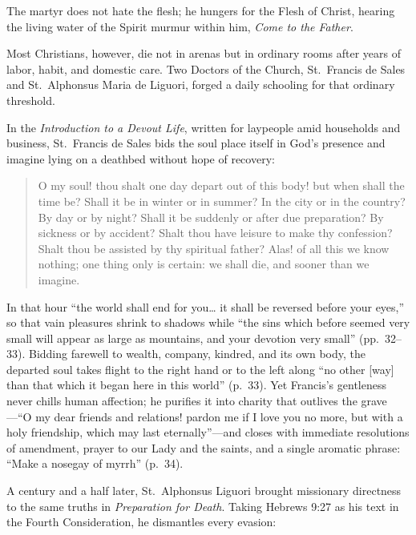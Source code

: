 The martyr does not hate the flesh; he hungers for the Flesh of Christ, hearing the living water of the Spirit murmur within him, \emph{Come to the Father}.

Most Christians, however, die not in arenas but in ordinary rooms after years of labor, habit, and domestic care. Two Doctors of the Church, St.\ Francis de Sales and St.\ Alphonsus Maria de Liguori, forged a daily schooling for that ordinary threshold.

In the \emph{Introduction to a Devout Life}, written for laypeople amid households and business, St.\ Francis de Sales bids the soul place itself in God's presence and imagine lying on a deathbed without hope of recovery:

\begin{quote}
O my soul! thou shalt one day depart out of this body! but when shall the time be? Shall it be in winter or in summer? In the city or in the country? By day or by night? Shall it be suddenly or after due preparation? By sickness or by accident? Shalt thou have leisure to make thy confession? Shalt thou be assisted by thy spiritual father? Alas! of all this we know nothing; one thing only is certain: we shall die, and sooner than we imagine.
\end{quote}

In that hour ``the world shall end for you\ldots{} it shall be reversed before your eyes,'' so that vain pleasures shrink to shadows while ``the sins which before seemed very small will appear as large as mountains, and your devotion very small'' (pp.\ 32--33). Bidding farewell to wealth, company, kindred, and its own body, the departed soul takes flight to the right hand or to the left along ``no other [way] than that which it began here in this world'' (p.\ 33). Yet Francis's gentleness never chills human affection; he purifies it into charity that outlives the grave---``O my dear friends and relations! pardon me if I love you no more, but with a holy friendship, which may last eternally''---and closes with immediate resolutions of amendment, prayer to our Lady and the saints, and a single aromatic phrase: ``Make a nosegay of myrrh'' (p.\ 34).

A century and a half later, St.\ Alphonsus Liguori brought missionary directness to the same truths in \emph{Preparation for Death}. Taking Hebrews 9:27 as his text in the Fourth Consideration, he dismantles every evasion:

